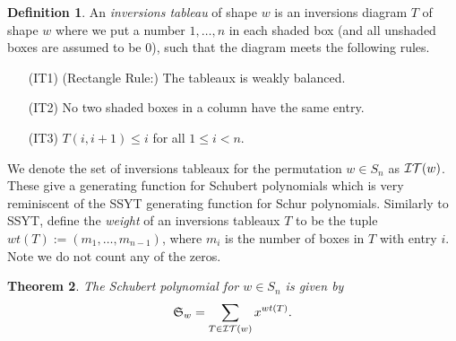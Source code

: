 \documentclass{article}
\newtheorem{theorem}{Theorem}[section]
\theoremstyle{definition}
\newtheorem{definition}[theorem]{Definition} %
\begin{document}
\begin{definition}\label{Def:??-tableaux}
An \emph{inversions tableau} of shape $w$ is an inversions diagram $T$ of shape $w$ where we put a number $1, \dots , n$ in each shaded box (and all unshaded boxes are assumed to be 0), such that the diagram meets the following rules.

\begin{enumerate}
    \item[(IT1)] (Rectangle Rule:) The tableaux is weakly balanced. 
    \item[(IT2)] No two shaded boxes in a column have the same entry.
    \item[(IT3)] $T(i,i+1) \leq i$ for all $1 \leq i < n$.
\end{enumerate}
\end{definition}

We denote the set of inversions tableaux for the permutation $w \in S_n$ as $\mathcal{IT}(w)$. These give a generating function for Schubert polynomials which is very reminiscent of the SSYT generating function for Schur polynomials. Similarly to SSYT, define the \emph{weight} of an inversions tableaux $T$ to be the tuple $wt(T) := (m_1,\ldots,m_{n-1})$, where $m_i$ is the number of boxes in $T$ with entry $i$. Note we do not count any of the zeros.

\begin{theorem}
\label{thrm:schub formula}
The Schubert polynomial for $w \in S_n$ is given by
    $$\mathfrak{S}_w = \sum\limits_{T \in \mathcal{IT}(w)} x^{wt(T)}.$$
\end{theorem}
\end{document}
